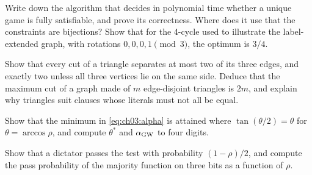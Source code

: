\documentclass[handoutsbeamer.tex]{subfiles}
\begin{document}
\begin{frame}
\begin{exe}
Write down the algorithm that decides in polynomial time whether a unique game is fully satisfiable, and prove its correctness. Where does it use that the constraints are bijections? Show that for the 4-cycle used to illustrate the label-extended graph, with rotations $0,0,0,1 \pmod 3$, the optimum is $3/4$.
\end{exe}
\begin{exe}[Triangles]
Show that every cut of a triangle separates at most two of its three edges, and exactly two unless all three vertices lie on the same side. Deduce that the maximum cut of a graph made of $m$ edge-disjoint triangles is $2m$, and explain why triangles suit clauses whose literals must not all be equal.
\end{exe}
\end{frame}

\begin{frame}
\begin{exe}
Show that the minimum in \eqref{eq:ch03:alpha} is attained where $\tan(\theta/2) = \theta$ for $\theta = \arccos\rho$, and compute $\theta^\ast$ and $\alpha_{\rm GW}$ to four digits.
\end{exe}
\begin{exe}[Dictators]
Show that a dictator passes the test with probability $(1-\rho)/2$, and compute the pass probability of the majority function on three bits as a function of $\rho$.
\end{exe}
\end{frame}

\begin{frame}[allowframebreaks]
\biblio
\end{frame}
\end{document}
